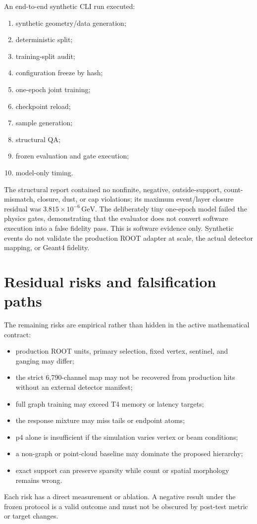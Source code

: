 \documentclass[10pt,a4paper]{article}
\newcommand{\GeV}{\,\mathrm{GeV}}
\begin{document}
An end-to-end synthetic CLI run executed:
\begin{enumerate}
\item synthetic geometry/data generation;
\item deterministic split;
\item training-split audit;
\item configuration freeze by hash;
\item one-epoch joint training;
\item checkpoint reload;
\item sample generation;
\item structural QA;
\item frozen evaluation and gate execution;
\item model-only timing.
\end{enumerate}
The structural report contained no nonfinite, negative, outside-support, count-mismatch, closure, dust, or cap violations; its maximum event/layer closure residual was $3.815\times10^{-6}\GeV$. The deliberately tiny one-epoch model failed the physics gates, demonstrating that the evaluator does not convert software execution into a false fidelity pass. This is software evidence only. Synthetic events do not validate the production ROOT adapter at scale, the actual detector mapping, or Geant4 fidelity.

\section{Residual risks and falsification paths}

The remaining risks are empirical rather than hidden in the active mathematical contract:
\begin{itemize}
\item production ROOT units, primary selection, fixed vertex, sentinel, and ganging may differ;
\item the strict 6,790-channel map may not be recovered from production hits without an external detector manifest;
\item full graph training may exceed T4 memory or latency targets;
\item the response mixture may miss tails or endpoint atoms;
\item p4 alone is insufficient if the simulation varies vertex or beam conditions;
\item a non-graph or point-cloud baseline may dominate the proposed hierarchy;
\item exact support can preserve sparsity while count or spatial morphology remains wrong.
\end{itemize}
Each risk has a direct measurement or ablation. A negative result under the frozen protocol is a valid outcome and must not be obscured by post-test metric or target changes.
\end{document}
